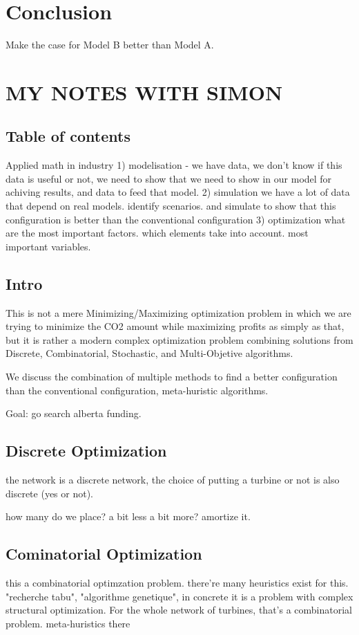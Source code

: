 \documentclass[12pt]{article}
\begin{document}
\section{Conclusion}
Make the case for Model B better than Model A. 

\section{MY NOTES WITH SIMON}
\subsection{Table of contents}
Applied math in industry
1) modelisation
  - we have data, we don't know if this data is useful or not, we need to show that we
need to show in our model for achiving results, and data to feed that model. 
2) simulation
we have a lot of data that depend on real models. identify scenarios. and simulate to 
show that this configuration is better than the conventional configuration 
3) optimization 
what are the most important factors. which elements take into account. most important
variables. 


\subsection{Intro}
This is not a mere Minimizing/Maximizing optimization problem in which we are trying to minimize the CO2 amount while maximizing profits as simply as that, but it is rather
a modern complex optimization problem combining solutions from Discrete, Combinatorial,
Stochastic, and Multi-Objetive algorithms. 

We discuss the combination of multiple methods to find a better configuration than
the conventional configuration, meta-huristic algorithms. 

Goal: go search alberta funding. 
 

\subsection{Discrete Optimization}
the network is a discrete network, the choice of putting a turbine or not is also
discrete (yes or not). 

how many do we place? a bit less a bit more? amortize it.

\subsection{Cominatorial Optimization}
this a combinatorial optimzation problem. there're many heuristics exist for this. 
"recherche tabu", "algorithme genetique", in concrete it is a problem with complex
structural optimization. 
For the whole network of turbines, that's a combinatorial problem. meta-huristics there
\end{document}

